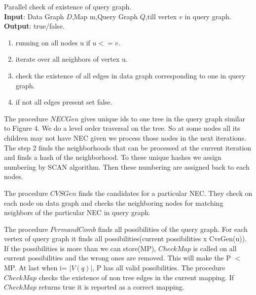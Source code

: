 \begin{breakablealgorithm}[H]
Parallel check of existence of query graph.\\
\textbf{Input}: Data Graph $D$,Map m,Query Graph $Q$,till vertex $v$ in query graph.\\
\textbf{Output}: true/false.\\
\begin{algorithmic}
\item \begin{enumerate}
\item running on all nodes u if $u<=v$.
\item iterate over all neighbors of vertex u.
\item \hspace{10mm}check the existence of all edges in data graph corresponding to one in query graph.
\item \hspace{10mm}if not all edges present set false.
\end{enumerate}

\end{algorithmic}
\end{breakablealgorithm}
\par The procedure $NECGen$ gives unique ids to one tree in the query graph similar to Figure 4. We do a level order traversal on the tree. So at some nodes all its children may not have NEC given we process those nodes in the next iterations. The step 2 finds the neighborhoods that can be processed at the current iteration and finds a hash of the neighborhood. To these unique hashes we assign numbering by SCAN algorithm. Then these numbering are assigned back to each nodes.
\par The procedure $CVSGen $ finds the candidates for a particular NEC. They check on each node on data graph and checks the neighboring nodes for matching neighbors of the particular NEC in query graph.
\par The procedure $PermandComb$ finds all possibilities of the query graph. For each vertex of query graph it finds all possibilities(current possibilities x CvsGen(u)). If the possibilities is more than we can store(MP), $CheckMap$ is called on all current possibilities and the wrong ones are removed. This will make the P $<$MP.  At last when i= $|V(q)|$,  P has all valid possibilities. The procedure $CheckMap$ checks the existence of non tree edges in the current 	mapping. If $CheckMap$ returns true it is reported as a correct mapping.
